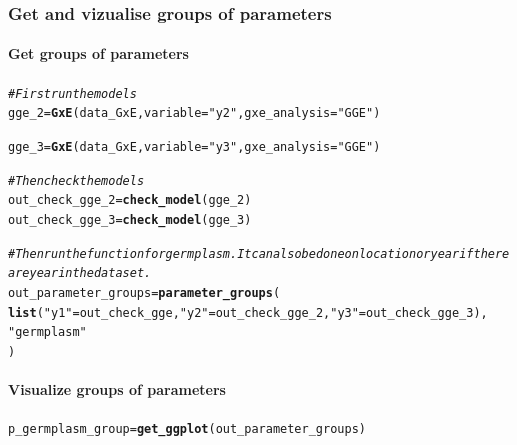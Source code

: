 \documentclass{book}\usepackage[]{graphicx}\usepackage[]{color}
\makeatletter
\newcommand{\hlstr}[1]{\textcolor[rgb]{0.192,0.494,0.8}{#1}}%
\newcommand{\hlcom}[1]{\textcolor[rgb]{0.678,0.584,0.686}{\textit{#1}}}%
\newcommand{\hlstd}[1]{\textcolor[rgb]{0.345,0.345,0.345}{#1}}%
\newcommand{\hlkwb}[1]{\textcolor[rgb]{0.69,0.353,0.396}{#1}}%
\newcommand{\hlkwc}[1]{\textcolor[rgb]{0.333,0.667,0.333}{#1}}%
\newcommand{\hlkwd}[1]{\textcolor[rgb]{0.737,0.353,0.396}{\textbf{#1}}}%
\newenvironment{kframe}{%
 \def\at@end@of@kframe{}%
 \ifinner\ifhmode%
  \def\at@end@of@kframe{\end{minipage}}%
  \begin{minipage}{\columnwidth}%
 \fi\fi%
 \def\FrameCommand##1{\hskip\@totalleftmargin \hskip-\fboxsep
 \colorbox{shadecolor}{##1}\hskip-\fboxsep
     \hskip-\linewidth \hskip-\@totalleftmargin \hskip\columnwidth}%
 \MakeFramed {\advance\hsize-\width
   \@totalleftmargin\z@ \linewidth\hsize
   \@setminipage}}%
 {\par\unskip\endMakeFramed%
 \at@end@of@kframe}
\newenvironment{knitrout}{}{} %
\makeatother
\begin{document}
\subsubsection{Get and vizualise groups of parameters}

\paragraph{Get groups of parameters}

\begin{knitrout}
\color{fgcolor}\begin{kframe}
\begin{alltt}
\hlcom{# First run the models}
\hlstd{gge_2} \hlkwb{=} \hlkwd{GxE}\hlstd{(data_GxE,} \hlkwc{variable} \hlstd{=} \hlstr{"y2"}\hlstd{,} \hlkwc{gxe_analysis} \hlstd{=} \hlstr{"GGE"}\hlstd{)}
\end{alltt}


{\ttfamily\noindent\itshape\color{messagecolor}{\#\# GGE model done for y2}}\begin{alltt}
\hlstd{gge_3} \hlkwb{=} \hlkwd{GxE}\hlstd{(data_GxE,} \hlkwc{variable} \hlstd{=} \hlstr{"y3"}\hlstd{,} \hlkwc{gxe_analysis} \hlstd{=} \hlstr{"GGE"}\hlstd{)}
\end{alltt}


{\ttfamily\noindent\itshape\color{messagecolor}{\#\# GGE model done for y3}}\begin{alltt}
\hlcom{# Then check the models}
\hlstd{out_check_gge_2} \hlkwb{=} \hlkwd{check_model}\hlstd{(gge_2)}
\hlstd{out_check_gge_3} \hlkwb{=} \hlkwd{check_model}\hlstd{(gge_3)}

\hlcom{# Then run the function for germplasm. It can also be done on location or year if there are year in the data set.}
\hlstd{out_parameter_groups} \hlkwb{=} \hlkwd{parameter_groups}\hlstd{(}
  \hlkwd{list}\hlstd{(}\hlstr{"y1"} \hlstd{= out_check_gge,} \hlstr{"y2"} \hlstd{= out_check_gge_2,} \hlstr{"y3"} \hlstd{= out_check_gge_3),}
  \hlstr{"germplasm"}
  \hlstd{)}
\end{alltt}
\end{kframe}
\end{knitrout}

\paragraph{Visualize groups of parameters}
\begin{knitrout}
\color{fgcolor}\begin{kframe}
\begin{alltt}
\hlstd{p_germplasm_group} \hlkwb{=} \hlkwd{get_ggplot}\hlstd{(out_parameter_groups)}
\end{alltt}
\end{kframe}
\end{knitrout}
\end{document}
